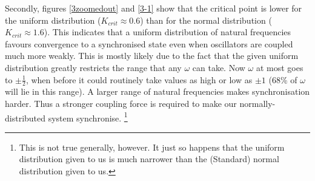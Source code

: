 \documentclass[11pt,a4paper]{article}
\begin{document}
Secondly, figures \ref{3zoomedout} and \ref{3-1} show that the critical point is lower for the uniform distribution ($K_{crit} \approx 0.6$) than for the normal distribution ($K_{crit} \approx 1.6$). 
This indicates that a uniform distribution of natural frequencies favours convergence to a synchronised state even when oscillators are coupled much more weakly. 
This is mostly likely due to the fact that the given uniform distribution greatly restricts the range that any $\omega$ can take. 
Now $\omega$ at most goes to $\pm \frac{1}{2}$, when before it could routinely take values as high or low as $\pm 1$ (68\% of $\omega$ will lie in this range).
A larger range of natural frequencies makes synchronisation harder. 
Thus a stronger coupling force is required to make our normally-distributed system synchronise.%
	\footnote{This is not true generally, however. It just so happens that the uniform distribution given to us is much narrower than the (Standard) normal distribution given to us.}
\end{document}
